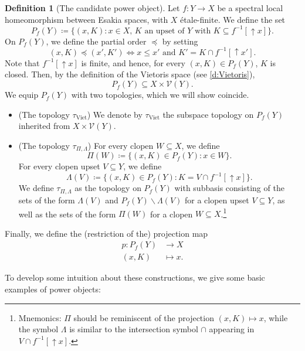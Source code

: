 \documentclass[12pt]{amsart}
\theoremstyle{plain}
\theoremstyle{definition}
\newtheorem{definition}[theorem]{Definition}
\newcommand{\V}{\mathcal{V}}
\newcommand{\Viet}{\mathrm{Viet}}
\renewcommand{\u}{{\uparrow}}
\begin{document}
\begin{definition}[The candidate power object]
    Let $f \colon Y\to X$ be a spectral local homeomorphism between Esakia spaces, with $X$ étale-finite.
    We define the set 
    \[
        P_{f}(Y)\coloneqq \{(x,K) : x\in X,\, K \text{ an upset of }Y \text{ with } K\subseteq f^{-1}[{\u}x]\}.
    \]
    On $P_{f}(Y)$, we define the partial order $\preceq$ by setting
    \[
        (x,K)\preceq (x',K') \iff x\leq x' \text{ and }K'=K\cap f^{-1}[{\u}x'].
    \]
    Note that $f^{-1}[{\u}x]$ is finite, and hence, for every $(x,K) \in P_f(Y)$, $K$ is closed.
    Then, by the definition of the Vietoris space (see \cref{d:Vietoris}),
    \[
        P_{f}(Y)\subseteq X\times \V(Y).
    \]
    We equip $P_{f}(Y)$ with two topologies, which we will show coincide.
    \begin{itemize}
        \item (The topology $\tau_\Viet$) We denote by $\tau_{\Viet}$ the subspace topology on $P_f(Y)$ inherited from $X\times \V(Y)$.
        \item (The topology $\tau_{\Pi, \Lambda}$)
        For every clopen $W\subseteq X$, we define
        \[
            \Pi(W) \coloneqq \{(x,K)\in P_{f}(Y) : x\in W\}.
        \]
        For every clopen upset $V\subseteq Y$, we define 
        \[
            \Lambda(V) \coloneqq \{(x,K)\in P_{f}(Y) : K=V\cap f^{-1}[{\u}x]\}.
        \]
        We define $\tau_{\Pi,\Lambda}$ as the topology on $P_f(Y)$ with subbasis consisting of the sets of the form $\Lambda(V)$ and $P_f(Y) \smallsetminus \Lambda(V)$ for a clopen upset $V \subseteq Y$, as well as the sets of the form $\Pi(W)$ for a clopen $W\subseteq X$.\footnote{Mnemonics: $\Pi$ should be reminiscent of the projection $(x, K) \mapsto x$, while the symbol $\Lambda$ is similar to the intersection symbol $\cap$ appearing in $V \cap f^{-1}[{\u}x]$.}
    \end{itemize}
    Finally, we define the (restriction of the) projection map
    \begin{align*}
        p \colon P_f(Y) & \longrightarrow X\\
        (x, K) & \longmapsto x.
    \end{align*}
\end{definition}



To develop some intuition about these constructions, we give some basic examples of power objects:
\end{document}
